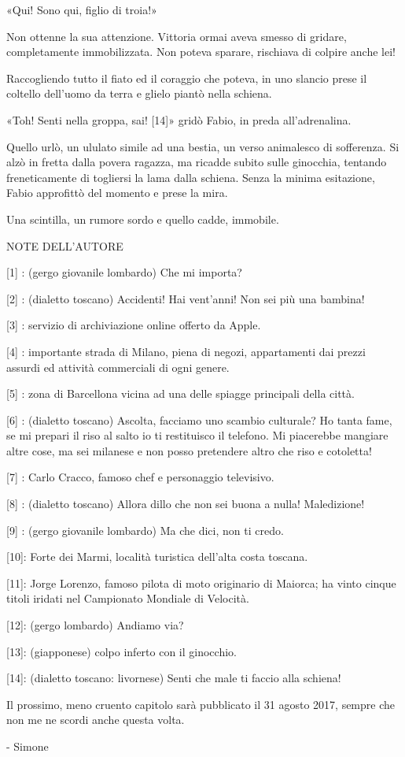 «Qui! Sono qui, figlio di troia!»

Non ottenne la sua attenzione. Vittoria ormai aveva smesso di gridare, completamente immobilizzata. Non poteva sparare, rischiava di colpire anche lei!

Raccogliendo tutto il fiato ed il coraggio che poteva, in uno slancio prese il coltello dell'uomo da terra e glielo piantò nella schiena.

«Toh! Senti nella groppa, sai! [14]» gridò Fabio, in preda all'adrenalina.

Quello urlò, un ululato simile ad una bestia, un verso animalesco di sofferenza. Si alzò in fretta dalla povera ragazza, ma ricadde subito sulle ginocchia, tentando freneticamente di togliersi la lama dalla schiena. Senza la minima esitazione, Fabio approfittò del momento e prese la mira.

Una scintilla, un rumore sordo e quello cadde, immobile.

NOTE DELL'AUTORE

[1] : (gergo giovanile lombardo) Che mi importa?

[2] : (dialetto toscano) Accidenti! Hai vent'anni! Non sei più una bambina!

[3] : servizio di archiviazione online offerto da Apple.

[4] : importante strada di Milano, piena di negozi, appartamenti dai prezzi assurdi ed attività commerciali di ogni genere.

[5] : zona di Barcellona vicina ad una delle spiagge principali della città.

[6] : (dialetto toscano) Ascolta, facciamo uno scambio culturale? Ho tanta fame, se mi prepari il riso al salto io ti restituisco il telefono. Mi piacerebbe mangiare altre cose, ma sei milanese e non posso pretendere altro che riso e cotoletta!

[7] : Carlo Cracco, famoso chef e personaggio televisivo.

[8] : (dialetto toscano) Allora dillo che non sei buona a nulla! Maledizione!

[9] : (gergo giovanile lombardo) Ma che dici, non ti credo.

[10]: Forte dei Marmi, località turistica dell'alta costa toscana.

[11]: Jorge Lorenzo, famoso pilota di moto originario di Maiorca; ha vinto cinque titoli iridati nel Campionato Mondiale di Velocità.

[12]: (gergo lombardo) Andiamo via?

[13]: (giapponese) colpo inferto con il ginocchio.

[14]: (dialetto toscano: livornese) Senti che male ti faccio alla schiena!

Il prossimo, meno cruento capitolo sarà pubblicato il 31 agosto 2017, sempre che non me ne scordi anche questa volta.

- Simone



